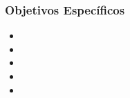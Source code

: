 \subsubsection{Objetivos Específicos}
\begin{itemize}[label=\textbullet, leftmargin=*, itemsep=0pt, topsep=0pt]
    \item \lipsum[1][1] %
    \item \lipsum[1][2] %
    \item \lipsum[1][3] %
    \item \lipsum[1][4] %
    \item \lipsum[1][5] %
\end{itemize}